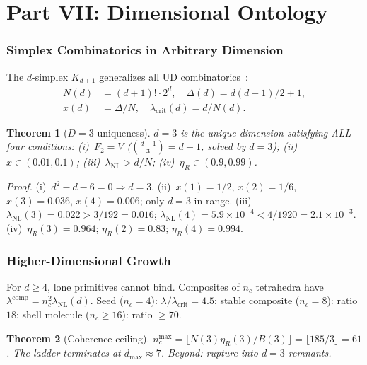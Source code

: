 \documentclass[11pt,twocolumn]{article}
\newtheorem{theorem}{Theorem}
\begin{document}

\part*{Part VII: Dimensional Ontology}

\section{Simplex Combinatorics in Arbitrary Dimension}
\label{sec:simplex}

The $d$-simplex $K_{d+1}$ generalizes all UD combinatorics~\cite{hutchinson1981}:
\begin{align}
N(d)&=(d{+}1)!\cdot 2^d,\quad \Delta(d)=d(d{+}1)/2+1,\\
x(d)&=\Delta/N,\quad \lambda_{\mathrm{crit}}(d)=d/N(d).
\end{align}

\begin{theorem}[$D=3$ uniqueness]
\label{thm:d3}
$d=3$ is the unique dimension satisfying ALL four conditions:
(i)~$F_2=V$ ($\binom{d+1}{3}=d+1$, solved by $d=3$);
(ii)~$x\in(0.01,0.1)$;
(iii)~$\lambda_{\mathrm{NL}}>d/N$;
(iv)~$\eta_R\in(0.9,0.99)$.
\end{theorem}

\textit{Proof.}
(i)~$d^2-d-6=0\Rightarrow d=3$.
(ii)~$x(1)=1/2$, $x(2)=1/6$, $x(3)=0.036$, $x(4)=0.006$; only $d=3$ in range.
(iii)~$\lambda_{\mathrm{NL}}(3)=0.022>3/192=0.016$; $\lambda_{\mathrm{NL}}(4)=5.9\times 10^{-4}<4/1920=2.1\times 10^{-3}$.
(iv)~$\eta_R(3)=0.964$; $\eta_R(2)=0.83$; $\eta_R(4)=0.994$.

\section{Higher-Dimensional Growth}
\label{sec:growth}

For $d\geq 4$, lone primitives cannot bind.
Composites of $n_c$ tetrahedra have $\lambda^{\mathrm{comp}}=n_c^2\lambda_{\mathrm{NL}}(d)$.
Seed ($n_c{=}4$): $\lambda/\lambda_{\mathrm{crit}}=4.5$; stable composite ($n_c{=}8$): ratio $18$; shell molecule ($n_c{\geq}16$): ratio ${\geq}70$.

\begin{theorem}[Coherence ceiling]
\label{thm:ceiling}
$n_c^{\max}=\lfloor N(3)\eta_R(3)/B(3)\rfloor=\lfloor 185/3\rfloor=61$.
The ladder terminates at $d_{\max}\approx 7$.
Beyond: rupture into $d{=}3$ remnants.
\end{theorem}
\end{document}
